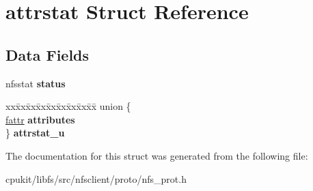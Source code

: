 \hypertarget{structattrstat}{}\section{attrstat Struct Reference}
\label{structattrstat}
\subsection*{Data Fields}
\begin{DoxyCompactItemize}
\item 
\mbox{\label{structattrstat_afd821dfd99950bf97aa37305e1419e0c}} 
nfsstat {\bfseries status}
\item 
\mbox{\label{structattrstat_a9e7d10604e48c82502212d128eff3e10}} 
\begin{tabbing}
xx\=xx\=xx\=xx\=xx\=xx\=xx\=xx\=xx\=\kill
union \{\\
\>\mbox{\hyperlink{structfattr}{fattr}} {\bfseries attributes}\\
\} {\bfseries attrstat\_u}\\

\end{tabbing}\end{DoxyCompactItemize}


The documentation for this struct was generated from the following file\+:\begin{DoxyCompactItemize}
\item 
cpukit/libfs/src/nfsclient/proto/nfs\+\_\+prot.\+h\end{DoxyCompactItemize}

